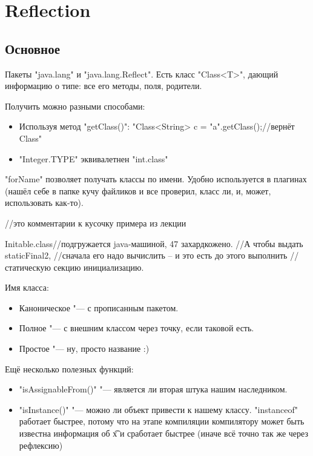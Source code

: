 \chapter{Reflection}
\section{Основное}
Пакеты \java"java.lang" и \java"java.lang.Reflect".
Есть класс \java"Class<T>", дающий информацию о типе: все его методы, поля, родители.

Получить можно разными способами:
\begin{itemize}
	\item
		Используя метод \java"getClass()":
		\java"Class<String> c = "a".getClass();//вернёт Class"
	\item
		\java"Integer.TYPE" эквивалетнен \java"int.class"
\end{itemize}

\java"forName" позволяет получать классы по имени. Удобно используется в плагинах
(нашёл себе в папке кучу файликов и все проверил, класс ли, и, может, использовать как-то).

\begin{javacode}
//это комментарии к кусочку примера из лекции

Initable.class//подгружается java-машиной, 47 захардкожено. 
//А чтобы выдать staticFinal2, 
//сначала его надо вычислить -- и это есть до этого выполнить
//статическую секцию инициализацию.
\end{javacode}

Имя класса:
\begin{itemize}
	\item 
		Каноническое "--- с прописанным пакетом.
	\item 
		Полное "--- с внешним классом через точку, если таковой есть.
	\item 
		Простое "--- ну, просто название :)
\end{itemize}

Ещё несколько полезных функций:
\begin{itemize}
	\item
		\java"isAssignableFrom()" "--- является ли вторая штука нашим наследником.
	\item
		\java"isInstance()" "--- можно ли объект привести к нашему классу.
		\java"instanceof" работает быстрее, 
		потому что на этапе компиляции компилятору может быть известна информация об \t{x} и сработает быстрее
		(иначе всё точно так же через рефлексию)
\end{itemize}

